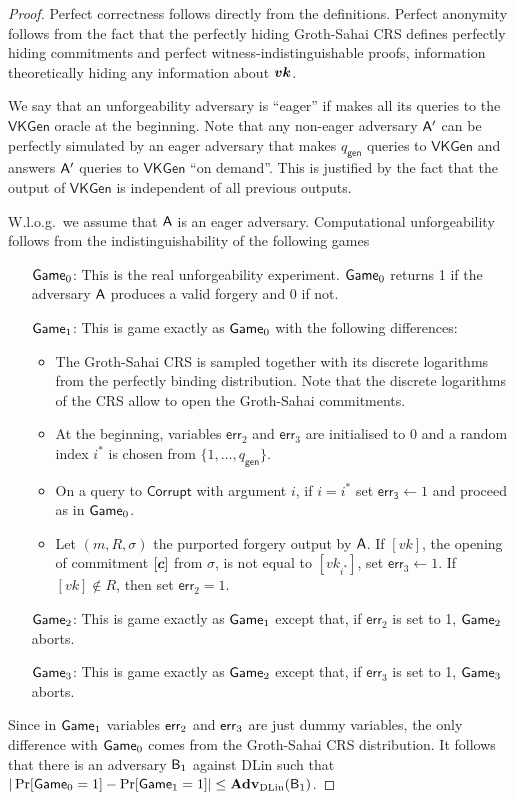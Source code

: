 \begin{proof}
Perfect correctness follows directly from the definitions. Perfect anonymity follows from the fact that the perfectly hiding Groth-Sahai CRS defines perfectly hiding commitments and perfect witness-indistinguishable proofs, information theoretically hiding any information about ${\boldsymbol{vk}}$.

We say that an unforgeability adversary is ``eager'' if  makes all its queries to the $\mathsf{VKGen}$ oracle at the beginning. Note that any non-eager adversary $\mathsf{A}'$ can be perfectly simulated  by an eager adversary that makes ${q_\mathsf{gen}}$ queries to $\mathsf{VKGen}$ and answers $\mathsf{A}'$ queries to $\mathsf{VKGen}$ ``on demand''. This is justified by the fact that the output of $\mathsf{VKGen}$ is independent of all previous outputs.

W.l.o.g.~we assume that $\mathsf{A}$ is an eager adversary. Computational unforgeability follows from the indistinguishability of the following games
\begin{itemize}
\item[$\mathsf{Game}_0$:] This is the real unforgeability experiment. $\mathsf{Game}_0$ returns 1 if the adversary $\mathsf{A}$ produces a valid forgery and 0 if not.
\item[$\mathsf{Game}_1$:] This is game exactly as $\mathsf{Game}_0$ with the following differences: 
    \begin{itemize}
    \item The Groth-Sahai CRS is sampled together with its discrete logarithms from the perfectly binding distribution. Note that the discrete logarithms of the CRS allow to open the Groth-Sahai commitments.
    \item At the beginning, variables $\mathsf{err}_2$ and $\mathsf{err}_3$ are initialised to $0$ and a random index $i^*$ is chosen from $\{1,\ldots, q_\mathsf{gen}\}$.
    \item On a query to $\mathsf{Corrupt}$ with argument $i$, if $i=i^*$ set $\mathsf{err_3}\gets 1$ and proceed as in $\mathsf{Game}_0$.
    \item Let $(m,R,\sigma)$ the purported forgery output by $\mathsf{A}$. If $[vk]$, the opening of commitment $[{\boldsymbol{c}}]$ from $\sigma$, is not equal to $[vk_{i^*}]$,  set $\mathsf{err}_3\gets 1$. If $[vk]\notin R$, then set $\mathsf{err}_2=1$.
    \end{itemize}
\item[$\mathsf{Game}_2$:] This is game exactly as $\mathsf{Game}_1$ except that, if $\mathsf{err}_2$ is set to 1, $\mathsf{Game}_2$ aborts.
\item[$\mathsf{Game}_3$:] This is game exactly as $\mathsf{Game}_2$ except that, if $\mathsf{err}_3$ is set to 1, $\mathsf{Game}_3$ aborts. 
\end{itemize}
Since in $\mathsf{Game}_1$ variables $\mathsf{err}_2$ and $\mathsf{err}_3$ are just dummy variables, the only difference with $\mathsf{Game}_0$ comes from the Groth-Sahai CRS distribution. It follows that there is an adversary $\mathsf{B}_{1}$ against DLin such that $|\Pr[\mathsf{Game}_0=1]-\Pr[\mathsf{Game}_1=1]|\leq \mathbf{Adv}_{\mathrm{DLin}}(\mathsf{B}_{1})$.


\end{proof}
